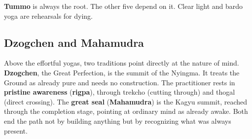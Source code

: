 \textbf{Tummo} is always the root. The other five depend on it. Clear light and bardo yoga are rehearsals for dying.

\subsection{Dzogchen and Mahamudra}

Above the effortful yogas, two traditions point directly at the nature of mind. \textbf{Dzogchen}, the Great Perfection, is the summit of the Nyingma. It treats the Ground as already pure and needs no construction. The practitioner rests in \textbf{pristine awareness} (\textbf{rigpa}), through trekcho (cutting through) and thogal (direct crossing). The \textbf{great seal} (\textbf{Mahamudra}) is the Kagyu summit, reached through the completion stage, pointing at ordinary mind as already awake. Both end the path not by building anything but by recognizing what was always present.
